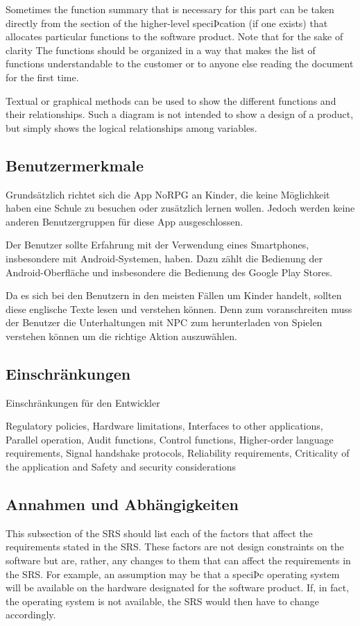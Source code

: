 		Sometimes the function summary that is necessary for this part can be taken directly from the section of the higher-level speciÞcation (if one exists) that allocates particular functions to the software product. Note that for the sake of clarity The functions should be organized in a way that makes the list of functions understandable to the customer or to anyone else reading the document for the first time.
		
		Textual or graphical methods can be used to show the different functions and their relationships. Such a diagram is not intended to show a design of a product, but simply shows the logical relationships among variables.
	
	\subsection{Benutzermerkmale}
		Grundsätzlich richtet sich die App NoRPG an Kinder, die keine Möglichkeit haben eine Schule zu besuchen oder zusätzlich lernen wollen. Jedoch werden keine anderen Benutzergruppen für diese App ausgeschlossen.
		
		Der Benutzer sollte Erfahrung mit der Verwendung eines Smartphones, insbesondere mit Android-Systemen, haben. Dazu zählt die Bedienung der Android-Oberfläche und insbesondere die Bedienung des Google Play Stores.
		
		Da es sich bei den Benutzern in den meisten Fällen um Kinder handelt, sollten diese englische Texte lesen und verstehen können. Denn zum voranschreiten muss der Benutzer die Unterhaltungen mit NPC zum herunterladen von Spielen verstehen können um die richtige Aktion auszuwählen.
	
	\subsection{Einschränkungen} 
		Einschränkungen für den Entwickler
				
		Regulatory policies, Hardware limitations, Interfaces to other applications, Parallel operation, Audit functions, Control functions, Higher-order language requirements, Signal handshake protocols, Reliability requirements, Criticality of the application and Safety and security considerations
	
	\subsection{Annahmen und Abhängigkeiten}
		This subsection of the SRS should list each of the factors that affect the requirements stated in the SRS. These factors are not design constraints on the software but are, rather, any changes to them that can affect the requirements in the SRS. For example, an assumption may be that a speciÞc operating system will be available on the hardware designated for the software product. If, in fact, the operating system is not available, the SRS would then have to change accordingly.

